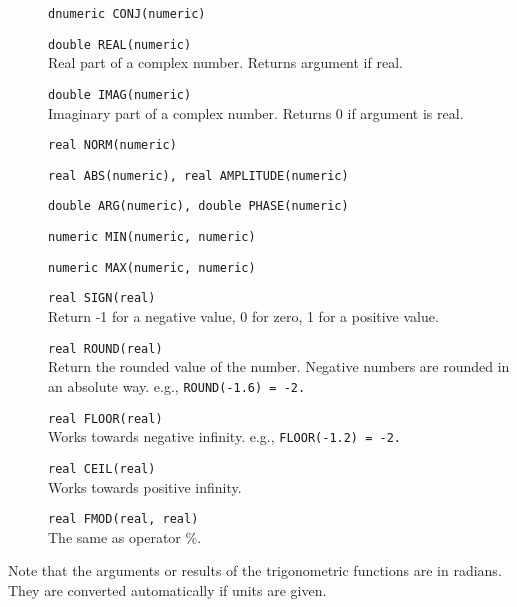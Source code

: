 \begin{description}
  \item[] \texttt{dnumeric CONJ(numeric)}
  \item[] \texttt{double REAL(numeric)}\\
    Real part of a complex number. Returns argument if real.
  \item[] \texttt{double IMAG(numeric)}\\
    Imaginary part of a complex number. Returns 0 if argument is real.
  \item[] \texttt{real NORM(numeric)}
  \item[] \texttt{real ABS(numeric),  real AMPLITUDE(numeric)}
  \item[] \texttt{double ARG(numeric),  double PHASE(numeric)}
  \item[] \texttt{numeric MIN(numeric, numeric)}
  \item[] \texttt{numeric MAX(numeric, numeric)}
  \item[] \texttt{real SIGN(real)}\\
    Return -1 for a negative value, 0 for zero, 1 for a positive value.
  \item[] \texttt{real ROUND(real)}\\
    Return the rounded value of the number. Negative numbers are
    rounded in an absolute way.
    e.g., \texttt{ROUND(-1.6) = -2.}
  \item[] \texttt{real FLOOR(real)}\\
    Works towards negative infinity.
    e.g., \texttt{FLOOR(-1.2) = -2.}
  \item[] \texttt{real CEIL(real)}\\
    Works towards positive infinity.
  \item[] \texttt{real FMOD(real, real)}\\
    The same as operator \%.
\end{description}
Note that the arguments or results of the trigonometric functions are
in radians. They are converted automatically if units are given.

